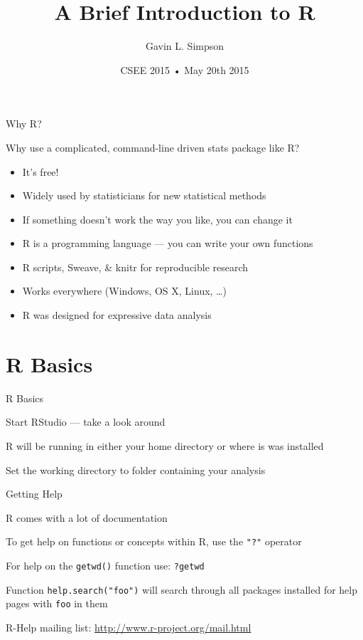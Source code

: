 \documentclass[10pt,ignorenonframetext,compress, aspectratio=169]{beamer}
\title{A Brief Introduction to R}
\author{Gavin L. Simpson}
\date{CSEE 2015 • May 20th 2015}
\begin{document}
\frame{\titlepage}

\begin{frame}{Why R?}

Why use a complicated, command-line driven stats package like R?

\begin{itemize}
\itemsep1pt\parskip0pt
\item
  It's free!
\item
  Widely used by statisticians for new statistical methods
\item
  If something doesn't work the way you like, you can change it
\item
  R is a programming language --- you can write your own functions
\item
  R scripts, \alert{Sweave}, \& \alert{knitr} for reproducible research
\item
  Works everywhere (Windows, OS X, Linux, \ldots{})
\item
  R was designed for expressive data analysis
\end{itemize}

\end{frame}

\section{R Basics}\label{r-basics}

\begin{frame}{R Basics}

Start \alert{RStudio} --- take a look around

R will be running in either your home directory or where is was
installed

Set the working directory to folder containing your analysis

\end{frame}

\begin{frame}{Getting Help}

R comes with a lot of documentation

To get help on functions or concepts within R, use the \texttt{"?"}
operator

For help on the \texttt{getwd()} function use: \texttt{?getwd}

Function \texttt{help.search("foo")} will search through all packages
installed for help pages with \texttt{foo} in them

R-Help mailing list: \url{http://www.r-project.org/mail.html}

\end{frame}
\end{document}
